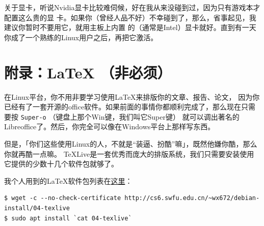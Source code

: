 \documentclass{wx672ctexart} \usepackage{hyperref}
\begin{document}
关于显卡，听说Nvidia显卡比较难伺候，好在我从来没碰到过，因为只有游戏本才配置这么贵的显
卡。如果你（曾经人品不好）不幸碰到了，那么，省事起见，我建议你暂时不要用它，就用主板上内置
的（通常是Intel）显卡就好。直到有一天你成了一个熟练的Linux用户之后，再把它激活。
\section{附录：\LaTeX{} （非必须）}
\label{sec:orgb7905fe}
在Linux平台，你不用非要学习使用\LaTeX{}来排版你的文章、报告、论文，
因为你已经有了一套开源的office软件。如果前面的事情你都顺利完成了，那么现在只需要按
\texttt{Super-o} （键盘上那个Win键，我们叫它Super键）
就可以调出著名的Libreoffice了。然后，你完全可以像在Windows平台上那样写东西。

但是，「你们这些使用Linux的人，不就是“装逼、扮酷”嘛」，既然他嫌你酷，那么你就再酷一点嘛。
TeXLive是一套优秀而庞大的排版系统，我们只需要安装使用它提供的少数十几个软件包就够了。

我个人用到的\LaTeX{}软件包列表在\href{https://cs6.swfu.edu.cn/\~wx672/debian-install/list.texlive}{这里}：
\begin{verbatim}
$ wget -c --no-check-certificate http://cs6.swfu.edu.cn/~wx672/debian-install/04-texlive
$ sudo apt install `cat 04-texlive`
\end{verbatim}
\end{document}
